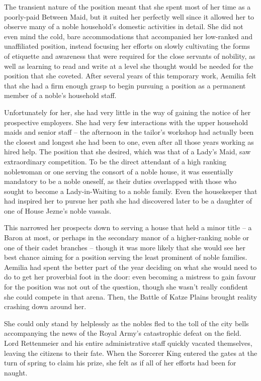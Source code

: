  

The transient nature of the position meant that she spent most of her time as a poorly-paid Between Maid, but it suited her perfectly well since it allowed her to observe many of a noble household’s domestic activities in detail. She did not even mind the cold, bare accommodations that accompanied her low-ranked and unaffiliated position, instead focusing her efforts on slowly cultivating the forms of etiquette and awareness that were required for the close servants of nobility, as well as learning to read and write at a level she thought would be needed for the position that she coveted. After several years of this temporary work, Aemilia felt that she had a firm enough grasp to begin pursuing a position as a permanent member of a noble’s household staff.

 

Unfortunately for her, she had very little in the way of gaining the notice of her prospective employers. She had very few interactions with the upper household maids and senior staff – the afternoon in the tailor’s workshop had actually been the closest and longest she had been to one, even after all those years working as hired help. The position that she desired, which was that of a Lady’s Maid, saw extraordinary competition. To be the direct attendant of a high ranking noblewoman or one serving the consort of a noble house, it was essentially mandatory to be a noble oneself, as their duties overlapped with those who sought to become a Lady-in-Waiting to a noble family. Even the housekeeper that had inspired her to pursue her path she had discovered later to be a daughter of one of House Jezne’s noble vassals.

 

This narrowed her prospects down to serving a house that held a minor title – a Baron at most, or perhaps in the secondary manor of a higher-ranking noble or one of their cadet branches – though it was more likely that she would see her best chance aiming for a position serving the least prominent of noble families. Aemilia had spent the better part of the year deciding on what she would need to do to get her proverbial foot in the door: even becoming a mistress to gain favour for the position was not out of the question, though she wasn’t really confident she could compete in that arena. Then, the Battle of Katze Plains brought reality crashing down around her.

 

She could only stand by helplessly as the nobles fled to the toll of the city bells accompanying the news of the Royal Army's catastrophic defeat on the field. Lord Rettenmeier and his entire administrative staff quickly vacated themselves, leaving the citizens to their fate. When the Sorcerer King entered the gates at the turn of spring to claim his prize, she felt as if all of her efforts had been for naught.

